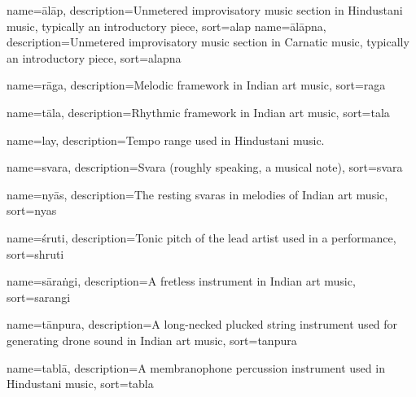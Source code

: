 
{
	name={\={a}l\={a}p},
	description={Unmetered improvisatory music section in Hindustani music, typically an introductory piece},
	sort=alap
}
{
	name={\={a}l\={a}pna},
	description={Unmetered improvisatory music section in Carnatic music, typically an introductory piece},
	sort=alapna
}

{
  name={r\={a}ga},
  description={Melodic framework in Indian art music},
  sort=raga
}


{
	name={t\={a}la},
	description={Rhythmic framework in Indian art music},
	sort=tala
}

{
	name={lay},
	description={Tempo range used in Hindustani music.}
}

{
	name={svara},
	description={Svara (roughly speaking, a musical note)},
	sort=svara
}


{
	name={ny\={a}s},
	description={The resting svaras in melodies of Indian art music},
	sort=nyas
}

{
	name={\'sruti},
	description={Tonic pitch of the lead artist used in a performance},
	sort=shruti
}

{
	name={s\={a}ra\.{n}gi},
	description={A fretless instrument in Indian art music},
	sort=sarangi
}

{
	name={t\={a}npura},
	description={A long-necked plucked string instrument used for generating drone sound in Indian art music},
	sort=tanpura
}

{
	name={tabl\={a}},
	description={A membranophone percussion instrument used in Hindustani music},
	sort=tabla
}

	
	
